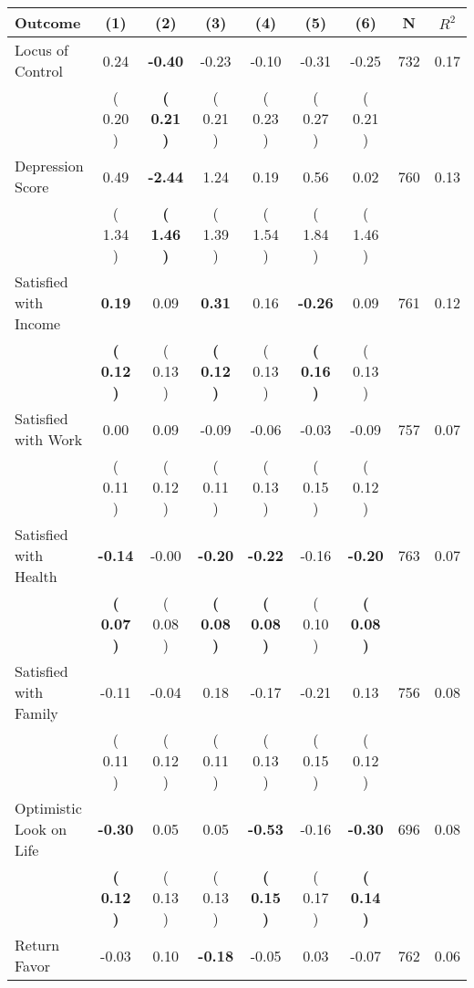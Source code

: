 \begin{tabular}{lcccccccc}
\toprule
 \textbf{Outcome} & \textbf{(1)} & \textbf{(2)} & \textbf{(3)} & \textbf{(4)} & \textbf{(5)} & \textbf{(6)} & \textbf{N} & \textbf{$ R^2$} \\
\midrule
Locus of Control &      0.24 & \textbf{    -0.40} &     -0.23 &     -0.10 &     -0.31 &     -0.25 & 732 &       0.17 \\ 
 & (     0.20 ) & \textbf{(     0.21 )} & (     0.21 ) & (     0.23 ) & (     0.27 ) & (     0.21 ) & \\
Depression Score &      0.49 & \textbf{    -2.44} &      1.24 &      0.19 &      0.56 &      0.02 & 760 &       0.13 \\ 
 & (     1.34 ) & \textbf{(     1.46 )} & (     1.39 ) & (     1.54 ) & (     1.84 ) & (     1.46 ) & \\
Satisfied with Income & \textbf{     0.19} &      0.09 & \textbf{     0.31} &      0.16 & \textbf{    -0.26} &      0.09 & 761 &       0.12 \\ 
 & \textbf{(     0.12 )} & (     0.13 ) & \textbf{(     0.12 )} & (     0.13 ) & \textbf{(     0.16 )} & (     0.13 ) & \\
Satisfied with Work &      0.00 &      0.09 &     -0.09 &     -0.06 &     -0.03 &     -0.09 & 757 &       0.07 \\ 
 & (     0.11 ) & (     0.12 ) & (     0.11 ) & (     0.13 ) & (     0.15 ) & (     0.12 ) & \\
Satisfied with Health & \textbf{    -0.14} &     -0.00 & \textbf{    -0.20} & \textbf{    -0.22} &     -0.16 & \textbf{    -0.20} & 763 &       0.07 \\ 
 & \textbf{(     0.07 )} & (     0.08 ) & \textbf{(     0.08 )} & \textbf{(     0.08 )} & (     0.10 ) & \textbf{(     0.08 )} & \\
Satisfied with Family &     -0.11 &     -0.04 &      0.18 &     -0.17 &     -0.21 &      0.13 & 756 &       0.08 \\ 
 & (     0.11 ) & (     0.12 ) & (     0.11 ) & (     0.13 ) & (     0.15 ) & (     0.12 ) & \\
Optimistic Look on Life & \textbf{    -0.30} &      0.05 &      0.05 & \textbf{    -0.53} &     -0.16 & \textbf{    -0.30} & 696 &       0.08 \\ 
 & \textbf{(     0.12 )} & (     0.13 ) & (     0.13 ) & \textbf{(     0.15 )} & (     0.17 ) & \textbf{(     0.14 )} & \\
Return Favor &     -0.03 &      0.10 & \textbf{    -0.18} &     -0.05 &      0.03 &     -0.07 & 762 &       0.06 \\ 

\end{tabular}
